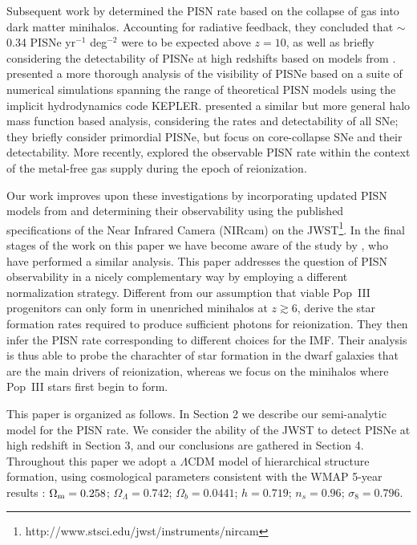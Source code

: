 \documentclass{thesis}
\begin{document}
Subsequent work by \citet{WiseAbel2005} determined the PISN rate based
on the collapse of gas into dark matter minihalos. Accounting for
radiative feedback, they concluded that $\sim$0.34 PISNe yr$^{-1}$
deg$^{-2}$ were to be expected above $z=10$, as well as briefly
considering the detectability of PISNe at high redshifts based on
models from \citet{HegerWoosley2002}.  \citet{Scannapiecoetal2005}
presented a more thorough analysis of the visibility of PISNe based
on a suite of numerical simulations spanning the range of theoretical
PISN models using the implicit hydrodynamics code
KEPLER. \citet{MesingerJohnsonHaiman2006} presented a similar but more
general halo mass function based analysis, considering the rates and
detectability of all SNe; they briefly consider primordial PISNe, but
focus on core-collapse SNe and their detectability.  More recently,
\citet{TrentiStiavelliShull2009} explored the observable PISN rate
within the context of the metal-free gas supply during the epoch of
reionization.

Our work improves upon these investigations by incorporating updated
PISN models from \citet{KasenWoosleyHeger2011} and determining their
observability using the published specifications of the Near Infrared
Camera (NIRcam) on the
JWST\footnote{http://www.stsci.edu/jwst/instruments/nircam}.
In the final stages of the work on this paper we have become aware of
the study by \citet{PanKasenLoeb2012}, who have performed a similar
analysis. This paper addresses the question of PISN observability in a
nicely complementary way by employing a different normalization
strategy. Different from our assumption that viable Pop~III
progenitors can only form in unenriched minihalos at $z\gtrsim6$,
\citet{PanKasenLoeb2012} derive the star formation rates required to
produce sufficient photons for reionization.  They then infer the PISN
rate corresponding to different choices for the IMF.  Their analysis
is thus able to probe the charachter of star formation in the dwarf
galaxies that are the main drivers of reionization, whereas we focus
on the minihalos where Pop~III stars first begin to form.

This paper is organized as follows.  In Section 2 we describe our
semi-analytic model for the PISN rate.  We consider the ability of the
JWST to detect PISNe at high redshift in Section 3, and our
conclusions are gathered in Section 4.  Throughout this paper we adopt
a $\Lambda$CDM model of hierarchical structure formation, using
cosmological parameters consistent with the WMAP 5-year results
\citep{Komatsu2009}: $\Omega_{\rm m} = 0.258$; $\Omega_{\Lambda}=0.742$;
$\Omega_b=0.0441$; $h=0.719$; $n_s=0.96$; $\sigma_8=0.796$.
\end{document}

